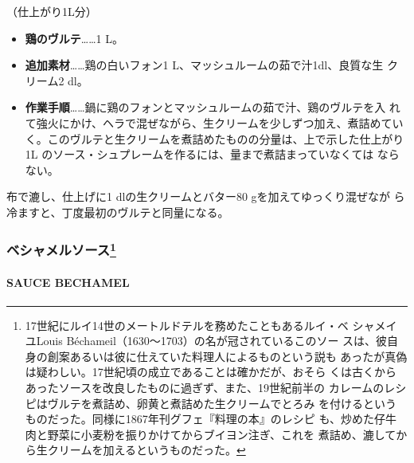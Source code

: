 \begin{recette}
（仕上がり1L分）

\begin{itemize}
\item
  \textbf{鶏のヴルテ}\ldots{}\ldots{}1 L。
\item
  \textbf{追加素材}\ldots{}\ldots{}鶏の白いフォン1
  L、マッシュルームの茹で汁1dl、良質な生 クリーム2 \undemi{} dl。
\item
  \textbf{作業手順}\ldots{}\ldots{}鍋に鶏のフォンとマッシュルームの茹で汁、鶏のヴルテを入
  れて強火にかけ、ヘラで混ぜながら、生クリームを少しずつ加え、煮詰めてい
  く。このヴルテと生クリームを煮詰めたものの分量は、上で示した仕上がり1L
  のソース・シュプレームを作るには、\untiers{}量まで煮詰まっていなくては
  ならない。
\end{itemize}

布で漉し、仕上げに1 dlの生クリームとバター80 gを加えてゆっくり混ぜなが
ら冷ますと、丁度最初のヴルテと同量になる。

\maeaki

\hypertarget{ux30d9ux30b7ux30e3ux30e1ux30ebux30bdux30fcux30b9102020}{%
\subsubsection[ベシャメルソース]{\texorpdfstring{ベシャメルソース\footnote{17世紀にルイ14世のメートルドテルを務めたこともあるルイ・ベ
  シャメイユLouis Béchameil（1630〜1703）の名が冠されているこのソー
  スは、彼自身の創案あるいは彼に仕えていた料理人によるものという説も
  あったが真偽は疑わしい。17世紀頃の成立であることは確かだが、おそら
  くは古くからあったソースを改良したものに過ぎず、また、19世紀前半の
  カレームのレシピはヴルテを煮詰め、卵黄と煮詰めた生クリームでとろみ
  を付けるというものだった。同様に1867年刊グフェ『料理の本』のレシピ
  も、炒めた仔牛肉と野菜に小麦粉を振りかけてからブイヨン注ぎ、これを
  煮詰め、漉してから生クリームを加えるというものだった。}}{ベシャメルソース}}\label{ux30d9ux30b7ux30e3ux30e1ux30ebux30bdux30fcux30b9102020}}

\hypertarget{sauce-bechamel}{%
\paragraph{SAUCE BECHAMEL}\label{sauce-bechamel}}



\end{recette}
